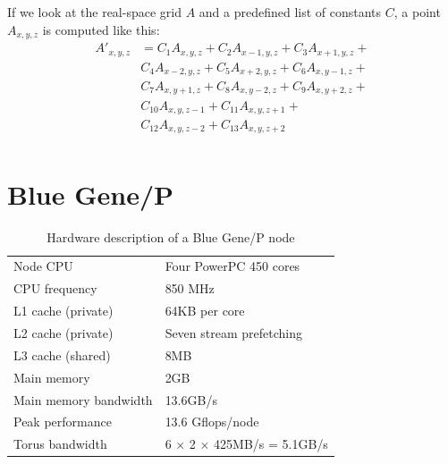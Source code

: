 \documentclass[preprint,3p,times,twocolumn]{elsarticle}
\begin{document}
If we look at the real-space grid $A$ and a predefined list of constants $C$, a point $A_{x,y,z}$ is computed like this:
\begin{displaymath}
\begin{array}{ll}
A'_{x,y,z} &= C_1 A_{x,y,z} + C_2 A_{x-1,y,z} + C_3 A_{x+1,y,z} +\\
           &  C_4 A_{x-2,y,z} + C_5 A_{x+2,y,z} + C_6 A_{x,y-1,z} +\\
           &  C_7 A_{x,y+1,z} + C_8 A_{x,y-2,z} + C_9 A_{x,y+2,z} +\\
           &  C_{10} A_{x,y,z-1} + C_{11} A_{x,y,z+1} +\\
           &  C_{12} A_{x,y,z-2} + C_{13} A_{x,y,z+2}\\
\end{array}
\end{displaymath}

\section{Blue Gene/P}
%
\begin{table}
\caption{Hardware description of a Blue Gene/P node}
\label{tab:bgp}
\centering
\begin{tabular}{l l}
\hline
Node CPU & Four PowerPC 450 cores\\
CPU frequency & 850 MHz\\
L1 cache (private) & 64KB per core\\
L2 cache (private) & Seven stream pre\-fetching\\
L3 cache (shared) & 8MB\\
Main memory & 2GB\\
Main memory bandwidth & 13.6GB/s\\
Peak performance & 13.6 Gflops/node\\
Torus bandwidth & 6 $\times$ 2 $\times$ 425MB/s = 5.1GB/s\\
\hline
\end{tabular}
\end{table}
\end{document}
